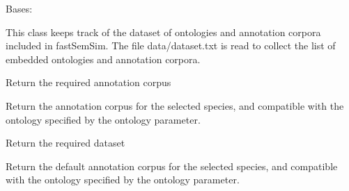 \documentclass[letterpaper,10pt,english]{sphinxmanual}
\begin{document}
\begin{fulllineitems}
\label{fastsemsim.data:fastsemsim.data.dataset.Dataset}
Bases: 

This class keeps track of the dataset of ontologies and annotation corpora included in fastSemSim.
The file data/dataset.txt is read to collect the list of embedded ontologies and annotation corpora.

\begin{fulllineitems}
\label{fastsemsim.data:fastsemsim.data.dataset.Dataset.get_annotation_corpus}
Return the required annotation corpus

\end{fulllineitems}


\begin{fulllineitems}
\label{fastsemsim.data:fastsemsim.data.dataset.Dataset.get_annotation_corpus_by_species}
Return the annotation corpus for the selected species, and compatible with the ontology specified by the ontology parameter.

\end{fulllineitems}


\begin{fulllineitems}
\label{fastsemsim.data:fastsemsim.data.dataset.Dataset.get_dataset}
Return the required dataset

\end{fulllineitems}


\begin{fulllineitems}
\label{fastsemsim.data:fastsemsim.data.dataset.Dataset.get_default_annotation_corpus}
Return the default annotation corpus for the selected species, and compatible with the ontology specified by the ontology parameter.


\end{fulllineitems}
\end{fulllineitems}
\end{document}
